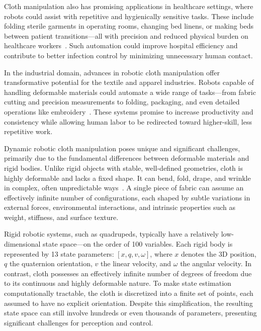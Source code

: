 Cloth manipulation also has promising applications in healthcare settings, where robots could assist with repetitive and hygienically sensitive tasks. These include folding sterile garments in operating rooms, changing bed linens, or making beds between patient transitions—all with precision and reduced physical burden on healthcare workers~\cite{seita2019deep}. Such automation could improve hospital efficiency and contribute to better infection control by minimizing unnecessary human contact.

In the industrial domain, advances in robotic cloth manipulation offer transformative potential for the textile and apparel industries. Robots capable of handling deformable materials could automate a wide range of tasks—from fabric cutting and precision measurements to folding, packaging, and even detailed operations like embroidery~\cite{torgerson1988vision}. These systems promise to increase productivity and consistency while allowing human labor to be redirected toward higher-skill, less repetitive work.

Dynamic robotic cloth manipulation poses unique and significant challenges, primarily due to the fundamental differences between deformable materials and rigid bodies. Unlike rigid objects with stable, well-defined geometries, cloth is highly deformable and lacks a fixed shape. It can bend, fold, drape, and wrinkle in complex, often unpredictable ways~\cite{borras2020grasping, sanchez2018robotic}. A single piece of fabric can assume an effectively infinite number of configurations, each shaped by subtle variations in external forces, environmental interactions, and intrinsic properties such as weight, stiffness, and surface texture.

Rigid robotic systems, such as quadrupeds, typically have a relatively low-dimensional state space—on the order of 100 variables. Each rigid body is represented by 13 state parameters: $[x, q, v, \omega]$, where $x$ denotes the 3D position, $q$ the quaternion orientation, $v$ the linear velocity, and $\omega$ the angular velocity. In contrast, cloth possesses an effectively infinite number of degrees of freedom due to its continuous and highly deformable nature. To make state estimation computationally tractable, the cloth is discretized into a finite set of points, each assumed to have no explicit orientation. Despite this simplification, the resulting state space can still involve hundreds or even thousands of parameters, presenting significant challenges for perception and control.

